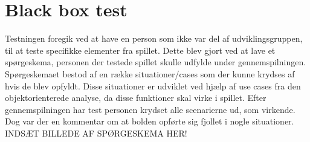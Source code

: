 
\section{Black box test}
Testningen foregik ved at have en person som ikke var del af udviklingsgruppen, til at teste specifikke elementer fra spillet. Dette blev gjort ved at lave et spørgeskema, personen der testede spillet skulle udfylde under gennemspilningen. Spørgeskemaet bestod af en række situationer/cases som der kunne krydses af hvis de blev opfyldt. Disse situationer er udviklet ved hjælp af use cases fra den objektorienterede analyse, da disse funktioner skal virke i spillet. Efter gennemspilningen har test personen krydset alle scenarierne ud, som virkende. Dog var der en kommentar om at bolden opførte sig fjollet i nogle situationer.
\newline\newline
INDSÆT BILLEDE AF SPØRGESKEMA HER!